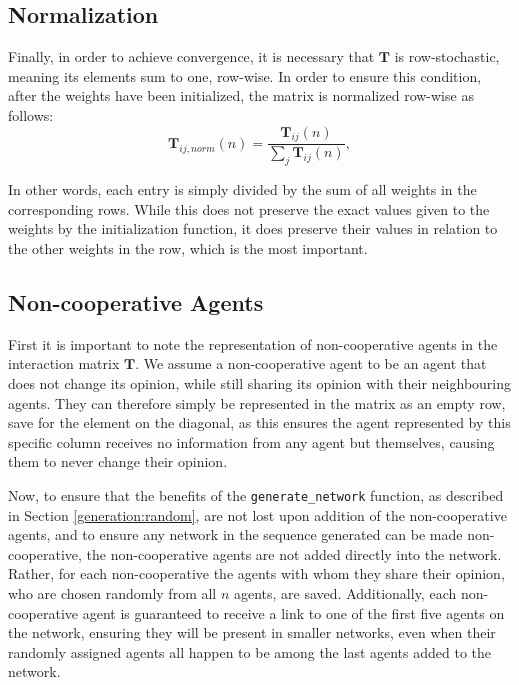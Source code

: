 \documentclass[a4paper, 12pt]{report}
\newcommand{\T}{\bm{T}}
\begin{document}
\subsection{Normalization}
\label{weights:normalization}
Finally, in order to achieve convergence, it is necessary that $\T$ is row-stochastic, meaning its elements sum to one, row-wise. In order to ensure this condition, after the weights have been initialized, the matrix is normalized row-wise as follows:
\begin{equation*}
    \T_{ij, norm}(n) = \frac{\T_{ij}(n)}{\sum_{j}\T_{ij}(n)},
\end{equation*}

\noindent In other words, each entry is simply divided by the sum of all weights in the corresponding rows. While this does not preserve the exact values given to the weights by the initialization function, it does preserve their values in relation to the other weights in the row, which is the most important.

\subsection{Non-cooperative Agents}

\noindent First it is important to note the representation of non-cooperative agents in the interaction matrix $\T$. We assume a non-cooperative agent to be an agent that does not change its opinion, while still sharing its opinion with their neighbouring agents. They can therefore simply be represented in the matrix as an empty row, save for the element on the diagonal, as this ensures the agent represented by this specific column receives no information from any agent but themselves, causing them to never change their opinion.

\noindent Now, to ensure that the benefits of the \texttt{generate\_network} function, as described in Section \ref{generation:random}, are not lost upon addition of the non-cooperative agents, and to ensure any network in the sequence generated can be made non-cooperative, the non-cooperative agents are not added directly into the network. Rather, for each non-cooperative the agents with whom they share their opinion, who are chosen randomly from all $n$ agents, are saved. Additionally, each non-cooperative agent is guaranteed to receive a link to one of the first five agents on the network, ensuring they will be present in smaller networks, even when their randomly assigned agents all happen to be among the last agents added to the network.
\end{document}
